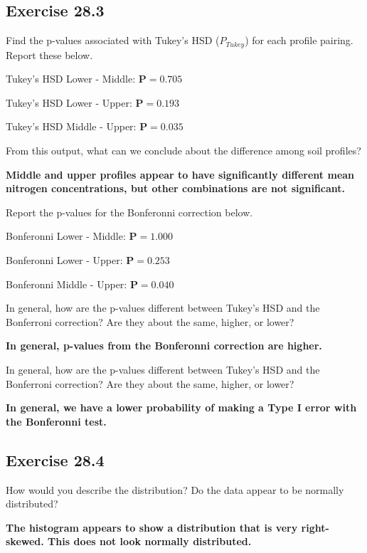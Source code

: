 \documentclass[
  openany]{krantz}
\begin{document}
\hypertarget{exercise-28.3}{%
\subsection{Exercise 28.3}\label{exercise-28.3}}

Find the p-values associated with Tukey's HSD (\(P_{Tukey}\)) for each profile pairing. Report these below.

Tukey's HSD Lower - Middle: \textbf{\(\mathbf{P = 0.705}\)}

Tukey's HSD Lower - Upper: \textbf{\(\mathbf{P = 0.193}\)}

Tukey's HSD Middle - Upper: \textbf{\(\mathbf{P = 0.035}\)}

From this output, what can we conclude about the difference among soil profiles?

\textbf{Middle and upper profiles appear to have significantly different mean nitrogen concentrations, but other combinations are not significant.}

Report the p-values for the Bonferonni correction below.

Bonferonni Lower - Middle: \textbf{\(\mathbf{P = 1.000}\)}

Bonferonni Lower - Upper: \textbf{\(\mathbf{P = 0.253}\)}

Bonferonni Middle - Upper: \textbf{\(\mathbf{P = 0.040}\)}

In general, how are the p-values different between Tukey's HSD and the Bonferroni correction? Are they about the same, higher, or lower?

\textbf{In general, p-values from the Bonferonni correction are higher.}

In general, how are the p-values different between Tukey's HSD and the Bonferroni correction? Are they about the same, higher, or lower?

\textbf{In general, we have a lower probability of making a Type I error with the Bonferonni test.}

\hypertarget{exercise-28.4}{%
\subsection{Exercise 28.4}\label{exercise-28.4}}

How would you describe the distribution? Do the data appear to be normally distributed?

\textbf{The histogram appears to show a distribution that is very right-skewed. This does not look normally distributed.}
\end{document}
